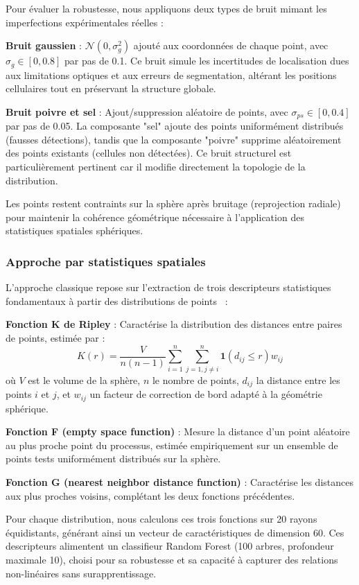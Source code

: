 Pour évaluer la robustesse, nous appliquons deux types de bruit mimant les imperfections expérimentales réelles :

\textbf{Bruit gaussien} : $\mathcal{N}(0, \sigma_g^2)$ ajouté aux coordonnées de chaque point, avec $\sigma_g \in [0, 0.8]$ par pas de 0.1. Ce bruit simule les incertitudes de localisation dues aux limitations optiques et aux erreurs de segmentation, altérant les positions cellulaires tout en préservant la structure globale.

\textbf{Bruit poivre et sel} : Ajout/suppression aléatoire de points, avec $\sigma_{ps} \in [0, 0.4]$ par pas de 0.05. La composante "sel" ajoute des points uniformément distribués (fausses détections), tandis que la composante "poivre" supprime aléatoirement des points existants (cellules non détectées). Ce bruit structurel est particulièrement pertinent car il modifie directement la topologie de la distribution.

Les points restent contraints sur la sphère après bruitage (reprojection radiale) pour maintenir la cohérence géométrique nécessaire à l'application des statistiques spatiales sphériques.

\subsubsection{Approche par statistiques spatiales}

L'approche classique repose sur l'extraction de trois descripteurs statistiques fondamentaux à partir des distributions de points~\cite{Baddeley2015} :

\textbf{Fonction K de Ripley} : Caractérise la distribution des distances entre paires de points, estimée par :
\[
\hat{K}(r) = \frac{V}{n(n-1)}\sum_{i=1}^{n}\sum_{j=1,j\neq i}^{n} \mathbf{1}(d_{ij} \leq r)w_{ij}
\]
où $V$ est le volume de la sphère, $n$ le nombre de points, $d_{ij}$ la distance entre les points $i$ et $j$, et $w_{ij}$ un facteur de correction de bord adapté à la géométrie sphérique.

\textbf{Fonction F (empty space function)} : Mesure la distance d'un point aléatoire au plus proche point du processus, estimée empiriquement sur un ensemble de points tests uniformément distribués sur la sphère.

\textbf{Fonction G (nearest neighbor distance function)} : Caractérise les distances aux plus proches voisins, complétant les deux fonctions précédentes.

Pour chaque distribution, nous calculons ces trois fonctions sur 20 rayons équidistants, générant ainsi un vecteur de caractéristiques de dimension 60. Ces descripteurs alimentent un classifieur Random Forest (100 arbres, profondeur maximale 10), choisi pour sa robustesse et sa capacité à capturer des relations non-linéaires sans surapprentissage.

